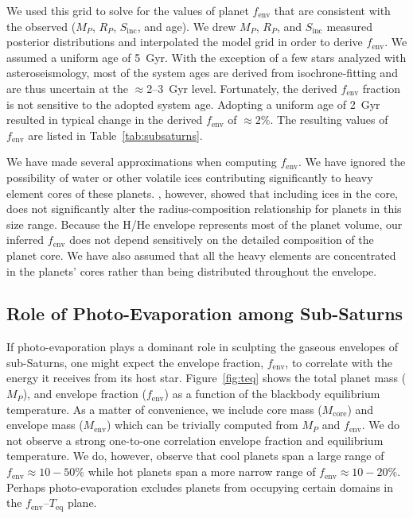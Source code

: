 \documentclass[preprint2]{aastex6}
\newcommand{\Mp}{\ensuremath{M_{P}}\xspace}
\newcommand{\Mcore}{\ensuremath{M_{\mathrm{core}}}\xspace}
\newcommand{\Menv}{\ensuremath{M_{\mathrm{env}}}\xspace}
\newcommand{\fenv}{\ensuremath{f_{\mathrm{env}}}\xspace}
\newcommand{\Rp}{\ensuremath{R_P}\xspace}
\newcommand{\Teq}{$T_{\mathrm{eq}}$\xspace}
\newcommand{\Sinc}{\ensuremath{S_{\mathrm{inc}}}\xspace}
\begin{document}
We used this grid to solve for the values of planet \fenv that are consistent with the observed (\Mp, \Rp, \Sinc, and age). We drew \Mp, \Rp, and \Sinc measured posterior distributions and interpolated the model grid in order to derive \fenv. We assumed a uniform age of 5~Gyr. With the exception of a few stars analyzed with asteroseismology, most of the system ages are derived from isochrone-fitting and are thus uncertain at the $\approx$2--3~Gyr level. Fortunately, the derived \fenv fraction is not sensitive to the adopted system age. Adopting a uniform age of 2~Gyr resulted in typical change in the derived \fenv of $\approx2\%$. The resulting values of \fenv are listed in Table~\ref{tab:subsaturns}.

We have made several approximations when computing \fenv. We have ignored the possibility of water or other volatile ices contributing significantly to heavy element cores of these planets. \citet{Lopez14}, however, showed that including ices in the core, does not significantly alter the radius-composition relationship for planets in this size range. Because the H/He envelope represents most of the planet volume, our inferred \fenv does not depend sensitively on the detailed composition of the planet core. We have also assumed that all the heavy elements are concentrated in the planets' cores rather than being distributed throughout the envelope. 

\subsection{Role of Photo-Evaporation among Sub-Saturns}
If photo-evaporation plays a dominant role in sculpting the gaseous envelopes of sub-Saturns, one might expect the envelope fraction, \fenv, to correlate with the energy it receives from its host star. Figure~\ref{fig:teq} shows the total planet mass (\Mp), and envelope fraction (\fenv) as a function of the blackbody equilibrium temperature. As a matter of convenience, we include core mass (\Mcore) and envelope mass (\Menv) which can be trivially computed from \Mp and \fenv. We do not observe a strong one-to-one correlation envelope fraction and equilibrium temperature. We do, however, observe that cool planets span a large range of $\fenv \approx 10-50\%$ while hot planets span a more narrow range of $\fenv \approx 10-20\%$. Perhaps photo-evaporation excludes planets from occupying certain domains in the \fenv--\Teq plane.
\end{document}
